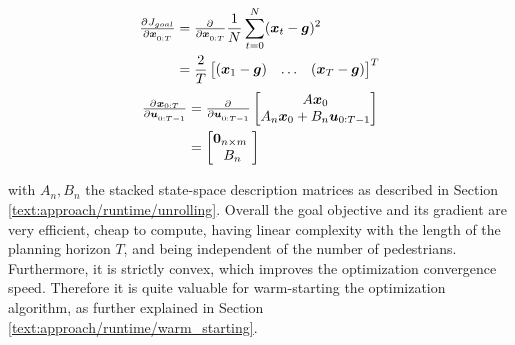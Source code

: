 \begin{align}
\pd{J_{goal}}{\x_{0:T}} &= \pd{}{\x_{0:T}} \frac{1}{N} \sum_{t = 0}^N (\x_t - \boldsymbol{g})^2 \\
&= \frac{2}{T} \begin{bmatrix} (\x_1 - \boldsymbol{g}) & \hdots & (\x_T - \boldsymbol{g}) \end{bmatrix}^T
\end{align}
\begin{align}
\pd{\x_{0:T}}{\u_{0:T-1}} &= \pd{}{\u_{0:T-1}} \begin{bmatrix} A \x_0 \\ A_n \x_0 + B_n \u_{0:T-1} \end{bmatrix} \\
&= \begin{bmatrix} \boldsymbol{0}_{n \times m} \\ B_n \end{bmatrix}
\label{eq:goal_gradient_dynamics}
\end{align}

with $A_n, B_n$ the stacked state-space description matrices as described in Section \ref{text:approach/runtime/unrolling}. 
\newline
Overall the goal objective and its gradient are very efficient, cheap to compute, having linear complexity with the length of the planning horizon $T$, and being independent of the number of pedestrians. Furthermore, it is strictly convex, which improves the optimization convergence speed. Therefore it is quite valuable for warm-starting the optimization algorithm, as further explained in Section \ref{text:approach/runtime/warm_starting}.


